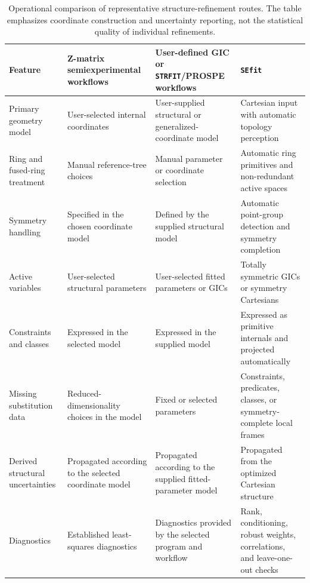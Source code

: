 \documentclass[journal=jctcce,manuscript=article,maxauthors=999]{achemso}
\begin{document}
\begin{table}
\caption{Operational comparison of representative structure-refinement routes.
The table emphasizes coordinate construction and uncertainty reporting, not
the statistical quality of individual refinements.}
\label{tab:workflow-comparison}
\scriptsize
\setlength{\tabcolsep}{3pt}
\begin{tabular}{@{}>{\raggedright\arraybackslash}p{}>{\raggedright\arraybackslash}p{}>{\raggedright\arraybackslash}p{}>{\raggedright\arraybackslash}p{}@{}}
\toprule
Feature & Z-matrix semiexperimental workflows & User-defined GIC or \texttt{STRFIT}/PROSPE workflows & \texttt{SEfit} \\
\midrule
Primary geometry model & User-selected internal coordinates & User-supplied structural or generalized-coordinate model & Cartesian input with automatic topology perception \\
Ring and fused-ring treatment & Manual reference-tree choices & Manual parameter or coordinate selection & Automatic ring primitives and non-redundant active spaces \\
Symmetry handling & Specified in the chosen coordinate model & Defined by the supplied structural model & Automatic point-group detection and symmetry completion \\
Active variables & User-selected structural parameters & User-selected fitted parameters or GICs & Totally symmetric GICs or symmetry Cartesians \\
Constraints and classes & Expressed in the selected model & Expressed in the supplied model & Expressed as primitive internals and projected automatically \\
Missing substitution data & Reduced-dimensionality choices in the model & Fixed or selected parameters & Constraints, predicates, classes, or symmetry-complete local frames \\
Derived structural uncertainties & Propagated according to the selected coordinate model & Propagated according to the supplied fitted-parameter model & Propagated from the optimized Cartesian structure \\
Diagnostics & Established least-squares diagnostics & Diagnostics provided by the selected program and workflow & Rank, conditioning, robust weights, correlations, and leave-one-out checks \\
\bottomrule
\end{tabular}
\end{table}
\end{document}
